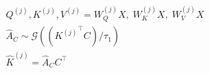 ﻿\documentclass{article}
\begin{document}
\begin{preview}
\(\displaystyle
\begin{gathered}
  Q^{(j)},K^{(j)},V^{(j)}
  = W_Q^{(j)}X,\;W_K^{(j)}X,\;W_V^{(j)}X \\
  \hat{A}_{C}
  \sim \mathcal{G}\left(({K^{(j)}}^\top C)/\tau_1\right) \\
  \hat{K}^{(j)}
  = \hat{A}_{C}C^\top 
\end{gathered}
\)
\end{preview}
\end{document}
